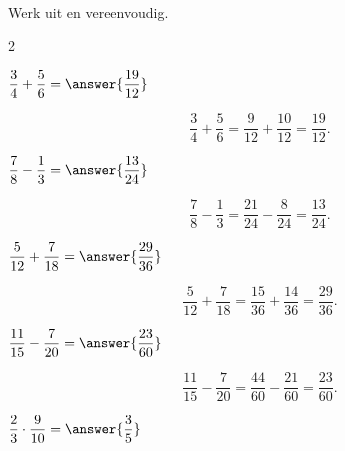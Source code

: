 \documentclass{ximera}
\begin{document}
    \begin{oefening}[Breuken]{\oefB\ESS}
        \\
        
        Werk uit en vereenvoudig.
        
        \begin{multicols}{2}
        
        \begin{question}
        $\dfrac34+\dfrac56=\answer{\dfrac{19}{12}}$
        
        \begin{oplossing}
        \[
        \dfrac34+\dfrac56
        =\dfrac9{12}+\dfrac{10}{12}
        =\dfrac{19}{12}.
        \]
        \end{oplossing}
        \end{question}
        
        
        \begin{question}
        $\dfrac78-\dfrac13=\answer{\dfrac{13}{24}}$
        
        \begin{oplossing}
        \[
        \dfrac78-\dfrac13
        =\dfrac{21}{24}-\dfrac8{24}
        =\dfrac{13}{24}.
        \]
        \end{oplossing}
        \end{question}
        
        
        \begin{question}
        $\dfrac5{12}+\dfrac7{18}=\answer{\dfrac{29}{36}}$
        
        \begin{oplossing}
        \[
        \dfrac5{12}+\dfrac7{18}
        =\dfrac{15}{36}+\dfrac{14}{36}
        =\dfrac{29}{36}.
        \]
        \end{oplossing}
        \end{question}
        
        
        \begin{question}
        $\dfrac{11}{15}-\dfrac7{20}=\answer{\dfrac{23}{60}}$
        
        \begin{oplossing}
        \[
        \dfrac{11}{15}-\dfrac7{20}
        =\dfrac{44}{60}-\dfrac{21}{60}
        =\dfrac{23}{60}.
        \]
        \end{oplossing}
        \end{question}
        
        
        \begin{question}
        $\dfrac23\cdot\dfrac9{10}=\answer{\dfrac35}$
        

\end{question}
\end{multicols}
\end{oefening}
\end{document}
